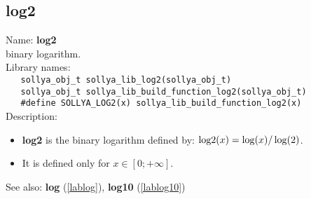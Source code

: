 \subsection{log2}
\label{lablog2}
\noindent Name: \textbf{log2}\\
\phantom{aaa}binary logarithm.\\[0.2cm]
\noindent Library names:\\
\verb|   sollya_obj_t sollya_lib_log2(sollya_obj_t)|\\
\verb|   sollya_obj_t sollya_lib_build_function_log2(sollya_obj_t)|\\
\verb|   #define SOLLYA_LOG2(x) sollya_lib_build_function_log2(x)|\\[0.2cm]
\noindent Description: \begin{itemize}

\item \textbf{log2} is the binary logarithm defined by: ${\rm log2}(x) = \log(x)/\log(2)$.

\item It is defined only for $x \in [0; +\infty]$.
\end{itemize}
See also: \textbf{log} (\ref{lablog}), \textbf{log10} (\ref{lablog10})
